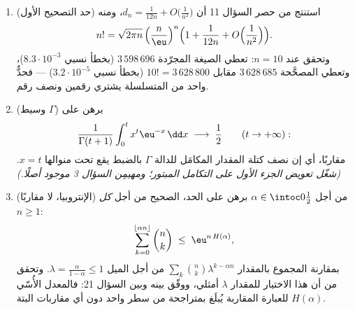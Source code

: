 \begin{problem}
\begin{enumerate}[resume]
        $s_{d-1} = d\,v_d$ (المبرهَن عليها بوصفها \cref{exo:b3:forms:6} في فصل الصيغ
        التفاضلية؛ ونأخذها هنا تعريفًا). كوِّن جدولًا للقيم
        $s_0, \dots, s_6$، وحدّد أكبرها ($d - 1 =
        6$، $s_6 = \frac{16\pi^3}{15} \approx 33.07$)، وبرهن على أن
        $s_{d-1} \to 0$ بسرعة تفوق الهندسية أيضًا --- فالكرات
        في الأبعاد العالية، بكل مقياس إقليدي، متلاشية الصغر.
  \item (حد التصحيح الأول) استنتج من حصر السؤال 11 أن $d_n = \frac1{12n} +
        O\bigl(\frac1{n^2}\bigr)$،
        ومنه
        \[
        n! = \sqrt{2\pi n}\,\Bigl(\frac
        n\eu\Bigr)^{n}\Bigl(1 + \frac1{12n} +
        O\Bigl(\frac1{n^2}\Bigr)\Bigr).
        \]
        وتحقق عند $n = 10$: تعطي الصيغة المجرّدة $3\,598\,696$
        (بخطأ نسبي $8.3\cdot10^{-3}$)، وتعطي المصحَّحة $3\,628\,685$
        مقابل $10! =
        3\,628\,800$ (بخطأ نسبي $3.2\cdot10^{-5}$) --- فحدٌّ واحد من
        المتسلسلة يشتري رقمين ونصف رقم.
  \item (وسيط $\Gamma$) برهن على
        \[
        \frac{1}{\Gamma(t+1)}
        \int_0^{t} x^{t}\eu^{-x}\,\dd x
        \;\longrightarrow\; \frac12
        \qquad (t \to +\infty) :
        \]
        مقاربًا، أي إن نصف كتلة المقدار المكامَل للدالة $\Gamma$
        بالضبط يقع تحت منوالها $x = t$. \emph{(شغّل تعويض الجزء
        الأول على التكامل المبتور؛ ومهيمِن السؤال 3 موجود
        أصلًا.)}
  \item (الإنتروبيا، لا مقاربًا) من أجل $\alpha \in
        \intoc0{\frac12}$ برهن على الحد،
        الصحيح من أجل \emph{كل} $n \geq 1$:
        \[
        \sum_{k=0}^{\lfloor\alpha n\rfloor}\binom nk
        \;\leq\; \eu^{n\,H(\alpha)} ,
        \]
        بمقارنة المجموع بالمقدار $\sum_k\binom
        nk\lambda^{k-\alpha n}$ من أجل الميل $\lambda =
        \frac{\alpha}{1-\alpha} \leq 1$. وتحقق
        من أن هذا الاختيار للمقدار $\lambda$ أمثلي، ووفّق بينه
        وبين السؤال 21: فالمعدل الأُسّي $H(\alpha)$ للعبارة
        المقاربة يُبلَغ بمتراجحة من سطر واحد دون أي مقاربات
        البتة.
\end{enumerate}
\end{problem}
